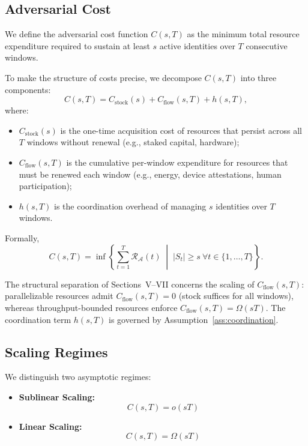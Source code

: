 \documentclass[journal]{IEEEtran}
\begin{document}
	\subsection{Adversarial Cost}
	
	We define the adversarial cost function $C(s,T)$
	as the minimum total resource expenditure required
	to sustain at least $s$ active identities
	over $T$ consecutive windows.
	
	To make the structure of costs precise, we decompose
	$C(s,T)$ into three components:
	\[
	C(s,T) = C_{\mathrm{stock}}(s) + C_{\mathrm{flow}}(s,T) + h(s,T),
	\]
	where:
	\begin{itemize}
		\item $C_{\mathrm{stock}}(s)$ is the one-time acquisition
		cost of resources that persist across all $T$ windows
		without renewal (e.g., staked capital, hardware);
		\item $C_{\mathrm{flow}}(s,T)$ is the cumulative
		per-window expenditure for resources that must be
		renewed each window (e.g., energy, device attestations,
		human participation);
		\item $h(s,T)$ is the coordination overhead of
		managing $s$ identities over $T$ windows.
	\end{itemize}
	
	Formally,
	\[
	C(s,T) =
	\inf
	\left\{
	\sum_{t=1}^{T} \mathcal{R}_{\mathcal{A}}(t)
	\;\middle|\;
	|S_t| \ge s \ \forall t \in \{1,\dots,T\}
	\right\}.
	\]
	
	The structural separation of Sections~V--VII concerns
	the scaling of $C_{\mathrm{flow}}(s,T)$:
	parallelizable resources admit $C_{\mathrm{flow}}(s,T)=0$
	(stock suffices for all windows), whereas
	throughput-bounded resources enforce
	$C_{\mathrm{flow}}(s,T) = \Omega(sT)$.
	The coordination term $h(s,T)$ is governed by
	Assumption~\ref{ass:coordination}.
	
	\subsection{Scaling Regimes}
	
	We distinguish two asymptotic regimes:
	
	\begin{itemize}
		\item \textbf{Sublinear Scaling:}
		\[
		C(s,T) = o(sT)
		\]
		
		\item \textbf{Linear Scaling:}
		\[
		C(s,T) = \Omega(sT)
		\]
	\end{itemize}
	
\end{document}

